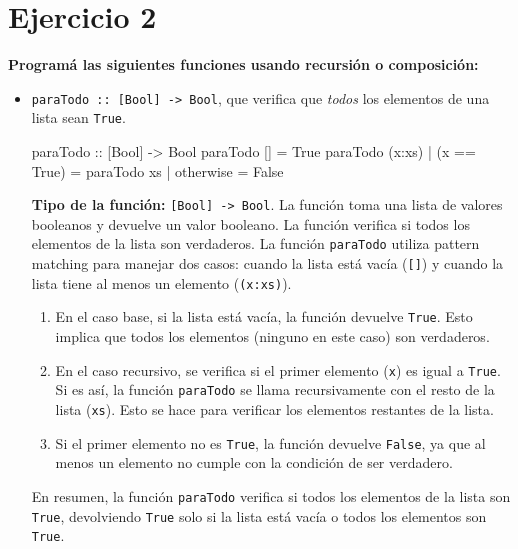 \documentclass{article}
\begin{document}
\section*{Ejercicio 2}
\textbf{Programá las siguientes funciones usando recursión o composición:}

\begin{itemize}
    \item 
\verb|paraTodo :: [Bool] -> Bool|, que verifica que \emph{todos} los elementos de una lista sean \verb|True|.
\begin{haskell}
paraTodo :: [Bool] -> Bool
paraTodo [] = True
paraTodo (x:xs) | (x == True) = paraTodo xs
                | otherwise = False
\end{haskell}
\textbf{Tipo de la función:} \verb|[Bool] -> Bool|. La función toma una lista de valores booleanos y devuelve un valor booleano. La función verifica si todos los elementos de la lista son verdaderos.
La función \verb|paraTodo| utiliza pattern matching para manejar dos casos: cuando la lista está vacía (\verb|[]|) y cuando la lista tiene al menos un elemento (\verb|(x:xs)|).
\begin{enumerate}
\item 
En el caso base, si la lista está vacía, la función devuelve \verb|True|. Esto implica que todos los elementos (ninguno en este caso) son verdaderos.
\item 
En el caso recursivo, se verifica si el primer elemento (\verb|x|) es igual a \verb|True|. Si es así, la función \verb|paraTodo| se llama recursivamente con el resto de la lista (\verb|xs|). Esto se hace para verificar los elementos restantes de la lista.
\item 
Si el primer elemento no es \verb|True|, la función devuelve \verb|False|, ya que al menos un elemento no cumple con la condición de ser verdadero.
\end{enumerate}
En resumen, la función \verb|paraTodo| verifica si todos los elementos de la lista son \verb|True|, devolviendo \verb|True| solo si la lista está vacía o todos los elementos son \verb|True|.


\end{itemize}
\end{document}
